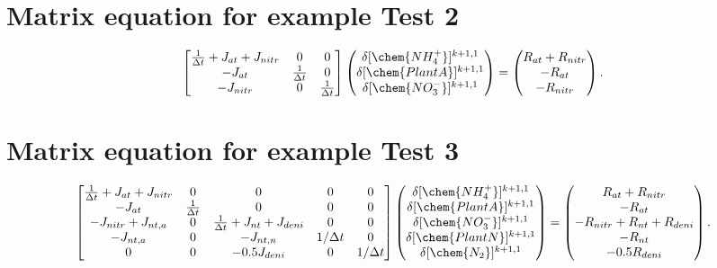 \documentclass[gmd, manuscript]{copernicus}
\begin{document}
\section{Matrix equation for example Test 2}
\begin{equation}
\left[
\begin{matrix}
\frac{1}{\Delta t} + J_{at} + J_{nitr} & 0 & 0 \\
-J_{at} & \frac{1}{\Delta t} & 0 \\
-J_{nitr} & 0 & \frac{1}{\Delta t} \\
\end{matrix}
\right]
\left(
\begin{matrix}
\delta [\chem{NH_4^+}]^{k+1,1} \\
\delta [\chem{PlantA}]^{k+1,1} \\
\delta [\chem{NO_3^-}]^{k+1,1} 
\end{matrix}
\right)
=
\left(
\begin{matrix}
R_{at} + R_{nitr} \\
-R_{at} \\
-R_{nitr} 
\end{matrix}
\right).
\label{eq:test2}
\end{equation}

\section{Matrix equation for example Test 3}
\label{sec:eqtest3}
\begin{equation}
\label{eq:complexjacobian}
\left[
\begin{matrix}
\frac{1}{\Delta t} + J_{at} + J_{nitr} & 0                  & 0                                   &0 & 0\\
-J_{at}                              & \frac{1}{\Delta t} & 0 &0 &0\\
-J_{nitr} + J_{nt,a}                 & 0                  & \frac{1}{\Delta t} + J_{nt} + J_{deni}&0 &0 \\
-J_{nt,a}                            & 0                  & -J_{nt,n}                             &1/\Delta t & 0 \\
 0                                   & 0                  & -0.5J_{deni}                             & 0 &1/\Delta t
\end{matrix}
\right]
\left(
\begin{matrix}
\delta [\chem{NH_4^+}]^{k+1,1} \\
\delta [\chem{PlantA}]^{k+1,1} \\
\delta [\chem{NO_3^-}]^{k+1,1} \\ 
\delta [\chem{PlantN}]^{k+1,1} \\
\delta [\chem{N_2}]^{k+1,1} 
\end{matrix}
\right)
=
\left(
\begin{matrix}
R_{at} + R_{nitr} \\
-R_{at} \\
-R_{nitr} + R_{nt} + R_{deni} \\
-R_{nt} \\
-0.5R_{deni}
\end{matrix}
\right).
\end{equation}
\end{document}
